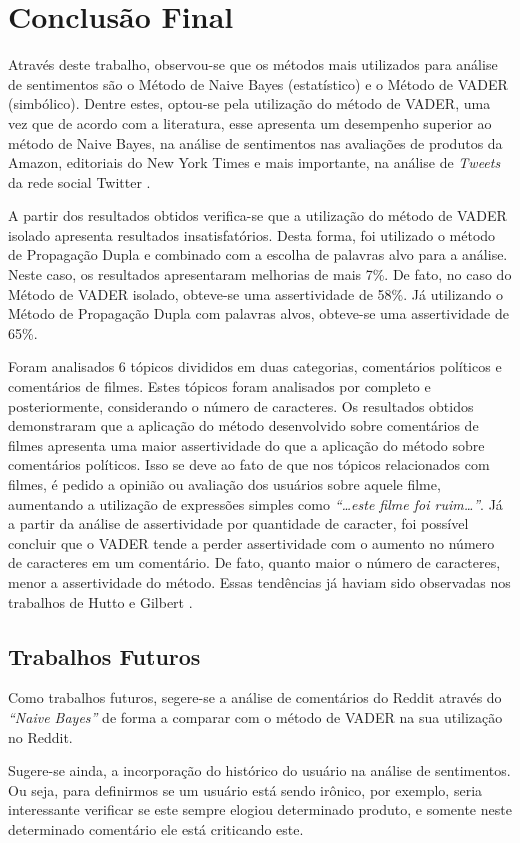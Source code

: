 \chapter{Conclusão Final}
\label{cap:conclusao}
Através deste trabalho, observou-se que os métodos mais utilizados para análise
de sentimentos são o Método de Naive Bayes (estatístico) e o Método de \ac{VADER} (simbólico). Dentre
estes, optou-se pela utilização do método de \ac{VADER}, uma vez que de acordo
com a literatura, esse apresenta um desempenho superior ao método de Naive
Bayes, na análise de sentimentos nas avaliações de
produtos da Amazon, editoriais do New York Times e mais importante, na análise
de \textit{Tweets} da rede social Twitter \cite{SentimentinSocialMedia}.

A partir dos resultados obtidos verifica-se que a utilização do método de
\ac{VADER} isolado apresenta resultados insatisfatórios. Desta forma, foi
utilizado o método de Propagação Dupla e combinado com a escolha de palavras
alvo para a análise. Neste caso, os resultados apresentaram melhorias de mais
7\%. De fato, no caso do Método de \ac{VADER} isolado, obteve-se uma
assertividade de 58\%. Já utilizando o Método de Propagação Dupla com palavras
alvos, obteve-se uma assertividade de 65\%.

Foram analisados 6 tópicos divididos em duas categorias,
comentários políticos e comentários de filmes. Estes tópicos foram analisados
por completo e posteriormente, considerando o número de caracteres. Os
resultados obtidos demonstraram que a aplicação do método desenvolvido sobre
comentários de filmes apresenta uma maior assertividade do que a aplicação do
método sobre comentários políticos. Isso se deve ao fato de que nos tópicos
relacionados com filmes, é pedido a opinião ou avaliação dos usuários sobre
aquele filme, aumentando a utilização de expressões simples como
\textit{``\ldots este filme foi ruim\ldots''}. Já a partir da análise de
assertividade por quantidade de caracter, foi possível concluir que o \ac{VADER}
tende a perder assertividade com o aumento no número de caracteres em um
comentário. De fato, quanto maior o número de
caracteres, menor a assertividade do método. Essas tendências já haviam sido
observadas nos trabalhos de Hutto e Gilbert \cite{conf/icwsm/HuttoG14}.


\section{Trabalhos Futuros}

Como trabalhos futuros, segere-se a análise de comentários do Reddit através
do \textit{``Naive Bayes''} de forma a comparar com o método de \ac{VADER} na
sua utilização no Reddit.

Sugere-se ainda, a incorporação do
histórico do usuário na análise de sentimentos. Ou seja, para definirmos se um
usuário está sendo irônico, por exemplo, seria interessante verificar se este
sempre elogiou determinado produto, e somente neste determinado comentário ele está criticando este.
